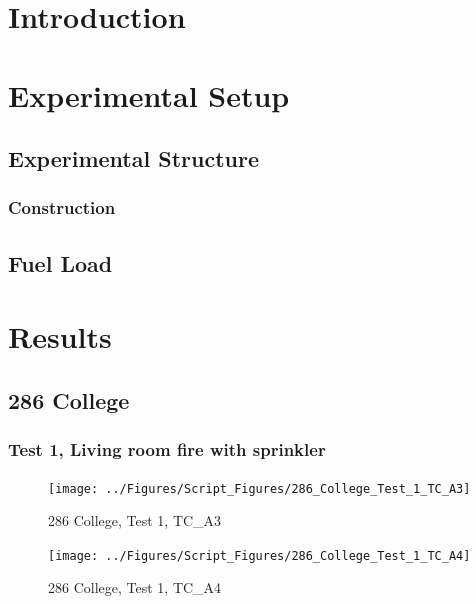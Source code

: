 \documentclass[11pt,oneside]{book}
\begin{document}
\mainmatter

\chapter{Introduction}
\label{chap:Introduction}

\chapter{Experimental Setup}
\label{chap:Experimental_Setup}

\section{Experimental Structure}
\label{sec:Experimental_Structure}

\subsection{Construction}
\label{sec:Construction}

\section{Fuel Load}

\chapter{Results}
\label{chap:Results}

\section{286 College}

\subsection{Test 1, Living room fire with sprinkler}

\begin{figure}[!ht]
\texttt{[image: ../Figures/Script\_Figures/286\_College\_Test\_1\_TC\_A3]}
\caption{286 College, Test 1, TC\_A3}
\label{fig:286_College_Test_1_TC_A3}
\end{figure}

\begin{figure}[!ht]
\texttt{[image: ../Figures/Script\_Figures/286\_College\_Test\_1\_TC\_A4]}
\caption{286 College, Test 1, TC\_A4}
\label{fig:286_College_Test_1_TC_A4}
\end{figure}
\end{document}
